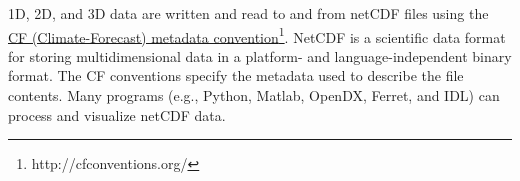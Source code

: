 1D, 2D, and 3D data are written and read to and from netCDF files using the 
\href{http://cfconventions.org/}{CF (Climate-Forecast) metadata convention}\footnote
{http://cfconventions.org/}. 
NetCDF is a scientific data format for storing multidimensional data in a platform- 
and language-independent binary format. The CF conventions specify the metadata 
used to describe the file contents.
Many programs (e.g., Python, Matlab, OpenDX, Ferret, and IDL) can process and visualize netCDF data.
